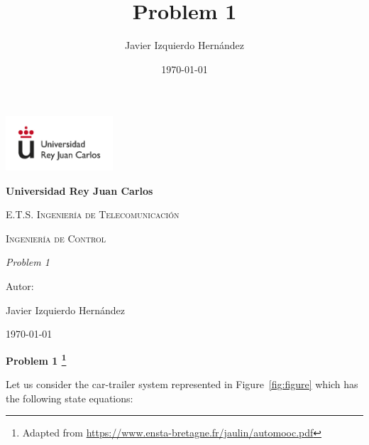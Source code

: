 \documentclass{article}
\title{Problem 1}
\author{Javier Izquierdo Hernández}
\date{\today}
\begin{document}
	\begin{titlepage}
	\centering
	{\includegraphics[width=0.3\textwidth]{figures/logo}\par}
	\vspace{1cm}
	{\bfseries\LARGE Universidad Rey Juan Carlos \par}
	\vspace{1cm}
	{\scshape\Large E.T.S. Ingeniería de Telecomunicación \par}
	\vspace{3cm}
	{\scshape\Huge Ingeniería de Control \par}
	\vspace{3cm}
	{\itshape\Large Problem 1 \par}
	\vfill
	{\Large Autor: \par}
	{\Large Javier Izquierdo Hernández \par}
	\vfill
	{\Large \today \par}
\end{titlepage}

\begin{center}
\huge \bf Problem 1 
\footnote{Adapted from \href{https://www.ensta-bretagne.fr/jaulin/automooc.pdf}{https://www.ensta-bretagne.fr/jaulin/automooc.pdf}}
\end{center}




Let us consider the car-trailer system represented in Figure~\ref{fig:figure} which has the following state equations:
\end{document}
